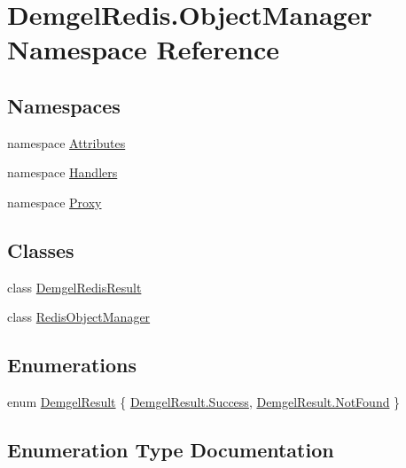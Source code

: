 \hypertarget{namespace_demgel_redis_1_1_object_manager}{}\section{Demgel\+Redis.\+Object\+Manager Namespace Reference}
\label{namespace_demgel_redis_1_1_object_manager}
\subsection*{Namespaces}
\begin{DoxyCompactItemize}
\item 
namespace \hyperlink{namespace_demgel_redis_1_1_object_manager_1_1_attributes}{Attributes}
\item 
namespace \hyperlink{namespace_demgel_redis_1_1_object_manager_1_1_handlers}{Handlers}
\item 
namespace \hyperlink{namespace_demgel_redis_1_1_object_manager_1_1_proxy}{Proxy}
\end{DoxyCompactItemize}
\subsection*{Classes}
\begin{DoxyCompactItemize}
\item 
class \hyperlink{class_demgel_redis_1_1_object_manager_1_1_demgel_redis_result}{Demgel\+Redis\+Result}
\item 
class \hyperlink{class_demgel_redis_1_1_object_manager_1_1_redis_object_manager}{Redis\+Object\+Manager}
\end{DoxyCompactItemize}
\subsection*{Enumerations}
\begin{DoxyCompactItemize}
\item 
enum \hyperlink{namespace_demgel_redis_1_1_object_manager_a7096c70132b203ab403de9dc8c33613d}{Demgel\+Result} \{ \hyperlink{namespace_demgel_redis_1_1_object_manager_a7096c70132b203ab403de9dc8c33613da505a83f220c02df2f85c3810cd9ceb38}{Demgel\+Result.\+Success}, 
\hyperlink{namespace_demgel_redis_1_1_object_manager_a7096c70132b203ab403de9dc8c33613da38c300f4fc9ce8a77aad4a30de05cad8}{Demgel\+Result.\+Not\+Found}
 \}
\end{DoxyCompactItemize}


\subsection{Enumeration Type Documentation}
\hypertarget{namespace_demgel_redis_1_1_object_manager_a7096c70132b203ab403de9dc8c33613d}{}
